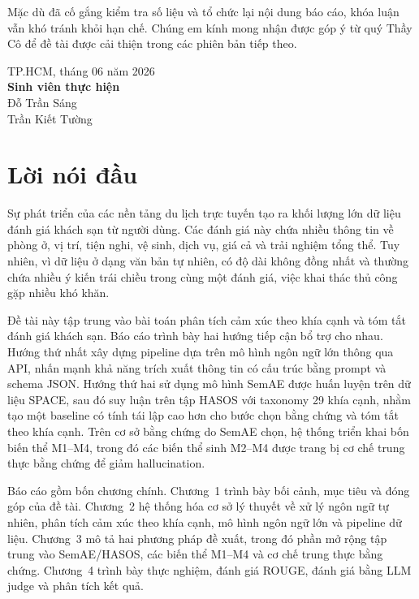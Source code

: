 \documentclass[12pt,a4paper]{report}
\newcommand{\cityname}{TP.HCM}
\newcommand{\reportyear}{2026}
\begin{document}
Mặc dù đã cố gắng kiểm tra số liệu và tổ chức lại nội dung báo cáo, khóa luận vẫn khó tránh khỏi hạn chế. Chúng em kính mong nhận được góp ý từ quý Thầy Cô để đề tài được cải thiện trong các phiên bản tiếp theo.

\begin{flushright}
\cityname, tháng 06 năm \reportyear\\
\textbf{Sinh viên thực hiện}\\
Đỗ Trần Sáng\\
Trần Kiết Tường
\end{flushright}

\clearpage

\chapter*{Lời nói đầu}

Sự phát triển của các nền tảng du lịch trực tuyến tạo ra khối lượng lớn dữ liệu đánh giá khách sạn từ người dùng. Các đánh giá này chứa nhiều thông tin về phòng ở, vị trí, tiện nghi, vệ sinh, dịch vụ, giá cả và trải nghiệm tổng thể. Tuy nhiên, vì dữ liệu ở dạng văn bản tự nhiên, có độ dài không đồng nhất và thường chứa nhiều ý kiến trái chiều trong cùng một đánh giá, việc khai thác thủ công gặp nhiều khó khăn.

Đề tài này tập trung vào bài toán phân tích cảm xúc theo khía cạnh và tóm tắt đánh giá khách sạn. Báo cáo trình bày hai hướng tiếp cận bổ trợ cho nhau. Hướng thứ nhất xây dựng pipeline dựa trên mô hình ngôn ngữ lớn thông qua API, nhấn mạnh khả năng trích xuất thông tin có cấu trúc bằng prompt và schema JSON. Hướng thứ hai sử dụng mô hình SemAE được huấn luyện trên dữ liệu SPACE, sau đó suy luận trên tập HASOS với taxonomy 29 khía cạnh, nhằm tạo một baseline có tính tái lập cao hơn cho bước chọn bằng chứng và tóm tắt theo khía cạnh. Trên cơ sở bằng chứng do SemAE chọn, hệ thống triển khai bốn biến thể M1--M4, trong đó các biến thể sinh M2--M4 được trang bị cơ chế trung thực bằng chứng để giảm hallucination.

Báo cáo gồm bốn chương chính. Chương~1 trình bày bối cảnh, mục tiêu và đóng góp của đề tài. Chương~2 hệ thống hóa cơ sở lý thuyết về xử lý ngôn ngữ tự nhiên, phân tích cảm xúc theo khía cạnh, mô hình ngôn ngữ lớn và pipeline dữ liệu. Chương~3 mô tả hai phương pháp đề xuất, trong đó phần mở rộng tập trung vào SemAE/HASOS, các biến thể M1--M4 và cơ chế trung thực bằng chứng. Chương~4 trình bày thực nghiệm, đánh giá ROUGE, đánh giá bằng LLM judge và phân tích kết quả.
\end{document}
